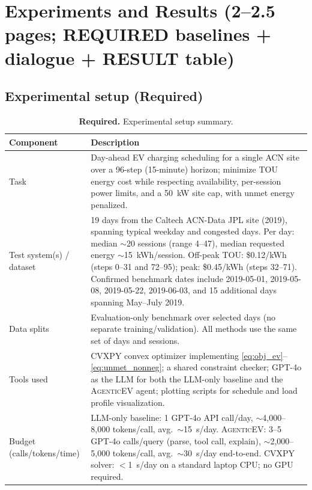 \documentclass{article}
\newcommand{\modelname}{\textsc{AgenticEV}}
\begin{document}
\section{Experiments and Results (2--2.5 pages; REQUIRED baselines + dialogue + RESULT table)}

\subsection{Experimental setup (Required)}
\begin{table}[ht]
\centering
\small
\begin{tabularx}{\linewidth}{l X}
\toprule
Component & Description \\
\midrule
Task & Day-ahead EV charging scheduling for a single ACN site over a 96-step (15-minute) horizon; minimize TOU energy cost while respecting availability, per-session power limits, and a 50~kW site cap, with unmet energy penalized. \\
Test system(s) / dataset & 19 days from the Caltech ACN-Data JPL site (2019), spanning typical weekday and congested days. Per day: median $\sim$20 sessions (range 4--47), median requested energy $\sim$15~kWh/session. Off-peak TOU: \$0.12/kWh (steps 0--31 and 72--95); peak: \$0.45/kWh (steps 32--71). Confirmed benchmark dates include 2019-05-01, 2019-05-08, 2019-05-22, 2019-06-03, and 15 additional days spanning May--July 2019. \\
Data splits & Evaluation-only benchmark over selected days (no separate training/validation). All methods use the same set of days and sessions. \\
Tools used & CVXPY convex optimizer implementing \eqref{eq:obj_ev}--\eqref{eq:unmet_nonneg}; a shared constraint checker; GPT-4o as the LLM for both the LLM-only baseline and the \modelname{} agent; plotting scripts for schedule and load profile visualization. \\
Budget (calls/tokens/time) & LLM-only baseline: 1 GPT-4o API call/day, $\sim$4{,}000--8{,}000 tokens/call, avg.\ $\sim$15~s/day. \modelname{}: 3--5 GPT-4o calls/query (parse, tool call, explain), $\sim$2{,}000--5{,}000 tokens/call, avg.\ $\sim$30~s/day end-to-end. CVXPY solver: $<$1~s/day on a standard laptop CPU; no GPU required. \\
\bottomrule
\end{tabularx}
\caption{\textbf{Required.} Experimental setup summary.}
\label{tab:setup}
\end{table}
\end{document}
